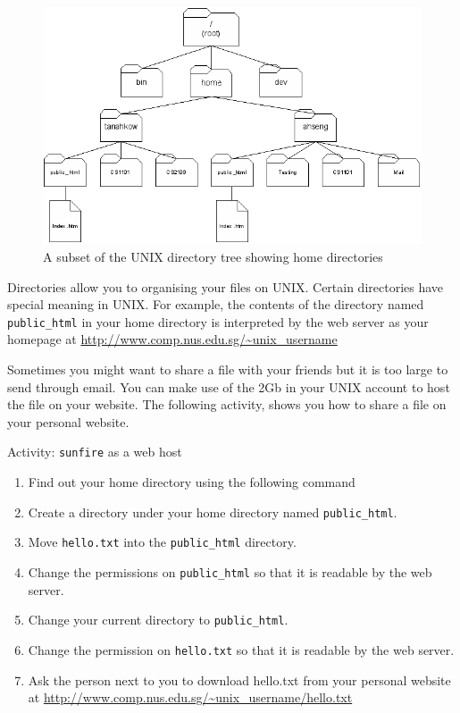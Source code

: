 \begin{frame}
\begin{figure}
\begin{center}
\includegraphics[scale=0.4]{file_home}
\end{center}
\caption{A subset of the UNIX directory tree showing home directories}
\label{fig:dir}
\end{figure}
\end{frame}

Directories allow you to organising your files on UNIX.  Certain directories
have special meaning in UNIX. For example, the contents of the directory named
\texttt{public\_html} in your home directory is interpreted by the web server as
your homepage at \url{http://www.comp.nus.edu.sg/~unix_username}

Sometimes you might want to share a file with your friends but it is too large
to send through email. You can make use of the 2Gb in your UNIX account to host
the file on your website. The following activity, shows you how to share a file
on your personal website.  

\begin{frame}[allowframebreaks=0.6]{Activity: \texttt{sunfire} as a web host}
\begin{enumerate}
\item Find out your home directory using the following command
\item Create a directory under your home directory named
\texttt{public\_html}. 
\item Move \texttt{hello.txt} into the \texttt{public\_html} directory. 
\item Change the permissions on \texttt{public\_html} so that it is readable by
the web server. 
\item Change your current directory to \texttt{public\_html}. 
\item Change the permission on \texttt{hello.txt} so that it is readable by the
web server.  
\item Ask the person next to you to download hello.txt from your personal
website at \url{http://www.comp.nus.edu.sg/~unix_username/hello.txt}
\end{enumerate}
\end{frame}


